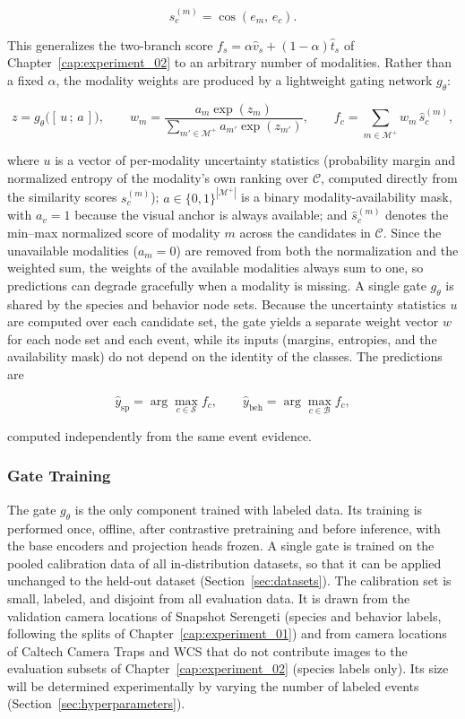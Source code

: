$$s_c^{(m)} = \cos\!\left(e_m,\, e_c\right).$$

This generalizes the two-branch score $f_s=\alpha \hat v_s+(1-\alpha)\hat t_s$ of Chapter~\ref{cap:experiment_02} to an arbitrary number of modalities. Rather than a fixed $\alpha$, the modality weights are produced by a lightweight gating network $g_\theta$:

$$z = g_\theta\big([\,u\,;\,a\,]\big), \qquad w_m = \frac{a_m \exp(z_m)}{\sum_{m'\in\mathcal{M}^{+}} a_{m'} \exp(z_{m'})}, \qquad f_c = \sum_{m \in \mathcal{M}^{+}} w_m \, \hat{s}_c^{(m)},$$

where $u$ is a vector of per-modality uncertainty statistics (probability margin and normalized entropy of the modality's own ranking over $\mathcal{C}$, computed directly from the similarity scores $s_c^{(m)}$); $a \in \{0,1\}^{|\mathcal{M}^{+}|}$ is a binary modality-availability mask, with $a_v=1$ because the visual anchor is always available; and $\hat{s}_c^{(m)}$ denotes the min--max normalized score of modality $m$ across the candidates in $\mathcal{C}$. Since the unavailable modalities ($a_m=0$) are removed from both the normalization and the weighted sum, the weights of the available modalities always sum to one, so predictions can degrade gracefully when a modality is missing. A single gate $g_\theta$ is shared by the species and behavior node sets. Because the uncertainty statistics $u$ are computed over each candidate set, the gate yields a separate weight vector $w$ for each node set and each event, while its inputs (margins, entropies, and the availability mask) do not depend on the identity of the classes. The predictions are

$$\hat{y}_{\mathrm{sp}} = \arg\max_{c \in \mathcal{S}} f_c, \qquad \hat{y}_{\mathrm{beh}} = \arg\max_{c \in \mathcal{B}} f_c,$$

computed independently from the same event evidence.

\subsubsection{Gate Training}\label{sec:gate_training}

The gate $g_\theta$ is the only component trained with labeled data. Its training is performed once, offline, after contrastive pretraining and before inference, with the base encoders and projection heads frozen. A single gate is trained on the pooled calibration data of all in-distribution datasets, so that it can be applied unchanged to the held-out dataset (Section~\ref{sec:datasets}). The calibration set is small, labeled, and disjoint from all evaluation data. It is drawn from the validation camera locations of Snapshot Serengeti (species and behavior labels, following the splits of Chapter~\ref{cap:experiment_01}) and from camera locations of Caltech Camera Traps and WCS that do not contribute images to the evaluation subsets of Chapter~\ref{cap:experiment_02} (species labels only). Its size will be determined experimentally by varying the number of labeled events (Section~\ref{sec:hyperparameters}).

